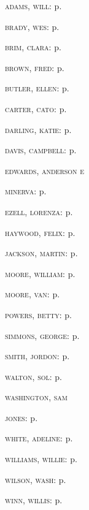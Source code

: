 \begin{multicols}{2}[]
{\small{
\textsc{adams, will:} p. \pageref{img14}

\textsc{brady, wes:} p. \pageref{img15}

\textsc{brim, clara:} p. \pageref{img4}

\textsc{brown, fred:} p. \pageref{img12}

\textsc{butler, ellen:} p. \pageref{img18}

\textsc{carter, cato:} p. \pageref{img10}

\textsc{darling, katie:} p. \pageref{img1}

\textsc{davis, campbell:} p. \pageref{img6}

\textsc{edwards, anderson e} 

\textsc{minerva:} p. \pageref{img16}

\textsc{ezell, lorenza:} p. \pageref{img7}

\textsc{haywood, felix:} p. \pageref{img21}

\textsc{jackson, martin:} p. \pageref{img13}

\textsc{moore, william:} p. \pageref{img19}

\textsc{moore, van:} p. \pageref{img22}

\textsc{powers, betty:} p. \pageref{img11}

\textsc{simmons, george:} p. \pageref{img5}

\textsc{smith, jordon:} p. \pageref{img2}

\textsc{walton, sol:} p. \pageref{img3}

\textsc{washington, sam}

\textsc{jones:} p. \pageref{img8}

\textsc{white, adeline:} p. \pageref{img23}

\textsc{williams, willie:} p. \pageref{img20}

\textsc{wilson, wash:} p. \pageref{img17}

\textsc{winn, willis:} p. \pageref{img9}
}}
\end{multicols}
